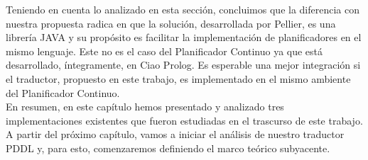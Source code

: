 Teniendo en cuenta lo analizado en esta secci\'on, concluimos que la
diferencia con nuestra propuesta radica en que la soluci\'on,
desarrollada por Pellier, es una librer\'ia JAVA y
su prop\'osito es facilitar la implementaci\'on de planificadores
en el mismo lenguaje. Este no es el caso del Pla\-ni\-fi\-ca\-dor Continuo
ya que est\'a desarrollado, \'integramente, en Ciao Prolog. Es esperable
una mejor integraci\'on si el traductor, propuesto en este
trabajo, es implementado en el mismo ambiente del Planificador Continuo. 
\ \\

En resumen, en este cap\'itulo hemos presentado y analizado tres 
implementaciones existentes que fueron
estudiadas en el trascurso de este trabajo. 
A partir del pr\'oximo cap\'itulo, vamos a iniciar el an\'alisis de nuestro traductor
PDDL y, para esto, comenzaremos definiendo el marco te\'orico subyacente.




